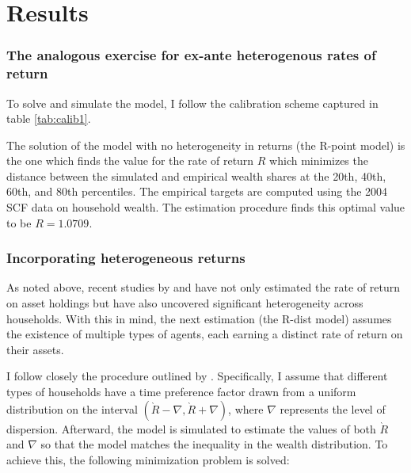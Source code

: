 
\section{Results}\notinsubfile{\label{sec:results}}

\subsubsection{The analogous exercise for ex-ante heterogenous rates of return}

\par To solve and simulate the model, I follow the calibration scheme captured in table \ref{tab:calib1}.
\unskip

\par The solution of the model with no heterogeneity in returns (the R-point model) is the one which finds the value for the rate of return $R$ which minimizes the distance between the simulated and empirical wealth shares at the 20th, 40th, 60th, and 80th percentiles. The empirical targets are computed using the 2004 SCF data on household wealth. The estimation procedure finds this optimal value to be $R = 1.0709$.

\subsubsection{Incorporating heterogeneous returns}

\par As noted above, recent studies by \cite{aflgdmlp20} and \cite{lblcps18} have not only estimated the rate of return on asset holdings but have also uncovered significant heterogeneity across households. With this in mind, the next estimation (the R-dist model) assumes the existence of multiple types of agents, each earning a distinct rate of return on their assets.

\par I follow closely the procedure outlined by \cite{cstw2017}. Specifically, I assume that different types of households have a time preference factor drawn from a uniform distribution on the interval $(\grave{R} - \nabla, \grave{R} + \nabla)$, where $\nabla$ represents the level of dispersion. Afterward, the model is simulated to estimate the values of both $\grave{R}$ and $\nabla$ so that the model matches the inequality in the wealth distribution. To achieve this, the following minimization problem is solved:

